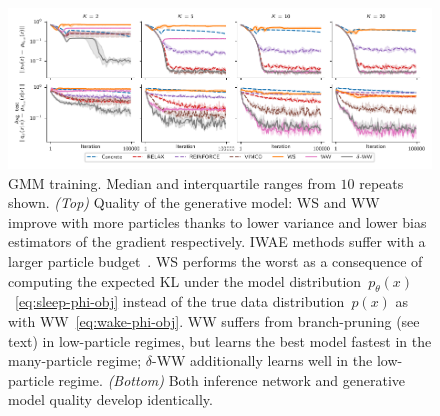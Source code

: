 \begin{figure}[!ht]
  \centering
  \includegraphics[width=\textwidth]{figures/RRWS/gmm/errors_no_std.pdf}
  \vspace*{-4ex}
  \caption{
    \Gls{GMM} training.
    Median and interquartile ranges from $10$ repeats shown.
    \emph{(Top)}
    Quality of the generative model:
    \gls{WS} and \gls{WW} improve with more particles thanks to lower variance and lower bias estimators of the gradient respectively.
    \Gls{IWAE} methods suffer with a larger particle budget~\citep{rainforth2018tighter}.
    \Gls{WS} performs the worst as a consequence of computing the expected \gls{KL} under the model distribution~\(p_\theta(x)\)~\cref{eq:sleep-phi-obj} instead of the true data distribution~\(p(x)\) as with \gls{WW}~\cref{eq:wake-phi-obj}.
    \Gls{WW} suffers from branch-pruning (see text) in low-particle regimes, but learns the best model fastest in the many-particle regime; $\delta$-\gls{WW} additionally learns well in the low-particle regime.
    \emph{(Bottom)}
    Both inference network and generative model quality develop identically.
  }
  \label{fig:gmm}
  \vspace*{-1ex}
\end{figure}

